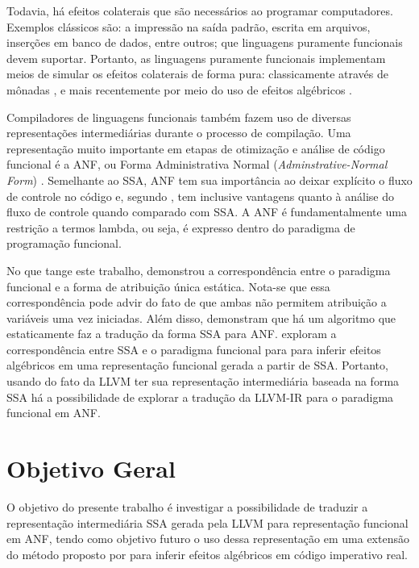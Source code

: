 Todavia, há efeitos colaterais que são necessários ao programar computadores. Exemplos clássicos são: a impressão na saída padrão, escrita em arquivos, inserções em banco de dados, entre outros; que linguagens puramente funcionais devem suportar. Portanto, as linguagens puramente funcionais implementam meios de simular os efeitos colaterais de forma pura: classicamente através de mônadas \cite{peyton1993imperative}, e mais recentemente por meio do uso de efeitos algébricos \cite{leijen2016algebraic}.

Compiladores de linguagens funcionais também fazem uso de diversas representações intermediárias durante o processo de compilação. Uma representação muito importante em etapas de otimização e análise de código funcional é a ANF, ou Forma Administrativa Normal (\emph{Adminstrative-Normal Form}) \cite{sabry1992reasoning}. Semelhante ao SSA, ANF tem sua importância ao deixar explícito o fluxo de controle no código e, segundo , tem inclusive vantagens quanto à análise do fluxo de controle quando comparado com SSA. A ANF é fundamentalmente uma restrição a termos lambda, ou seja, é expresso dentro do paradigma de programação funcional.

No que tange este trabalho,  demonstrou a correspondência entre o paradigma funcional e a forma de atribuição única estática. Nota-se que essa correspondência pode advir do fato de que ambas não permitem atribuição a variáveis uma vez iniciadas. Além disso,  demonstram que há um algoritmo que estaticamente faz a tradução da forma SSA para ANF.  exploram a correspondência entre SSA e o paradigma funcional para para inferir efeitos algébricos em uma representação funcional gerada a partir de SSA. Portanto, usando do fato da LLVM ter sua representação intermediária baseada na forma SSA há a possibilidade de explorar a tradução da LLVM-IR para o paradigma funcional em ANF.

\section{Objetivo Geral}

O objetivo do presente trabalho é investigar a possibilidade de traduzir a representação intermediária SSA gerada pela LLVM para representação funcional em ANF, tendo como objetivo futuro o uso dessa representação em uma extensão do método proposto por  para inferir efeitos algébricos em código imperativo real.

